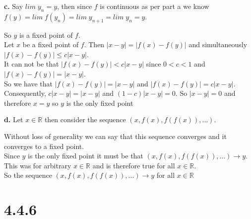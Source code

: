 \documentclass{article}
\begin{document}
{\Large\textbf{c.}} Say $lim\; y_n = y$, then since $f$ is continuous as per part a we know $f(y) = lim\; f(y_n) = lim\; y_{n+1} = lim\; y_n = y$.
\begin{center}
    \doublespacing
    So $y$ is a fixed point of $f$.
    \\Let $x$ be a fixed point of $f$. Then $|x - y| = |f(x) - f(y)|$ and simultaneously $|f(x) - f(y)|\leq c|x - y|$.
    \\It can not be that $|f(x) - f(y)| < c|x - y|$ since $0 < c < 1$ and $|f(x) - f(y)| = |x - y|$.
    \\So we have that $|f(x) - f(y)| = |x - y|$ and $|f(x) - f(y)| = c|x - y|$.
    \\Consequently, $c|x - y| = |x - y|$ and $(1 - c)|x - y| = 0$. So $|x - y| = 0$ and therefore $x = y$ so $y$ is the only fixed point \qedsymbol
\end{center}

{\Large\textbf{d.}} Let $x\in\mathbb{R}$ then consider the sequence $(x, f(x), f(f(x)), ...)$.
\begin{center}
    \doublespacing
    Without loss of generality we can say that this sequence converges and it converges to a fixed point.
    \\Since $y$ is the only fixed point it must be that $(x, f(x), f(f(x)), ...)\rightarrow y$.
    \\This was for arbitrary $x\in\mathbb{R}$ and is therefore true for all $x\in\mathbb{R}$.
    \\So the sequence $(x, f(x), f(f(x)), ...)\rightarrow y$ for all $x\in\mathbb{R}$ \qedsymbol
\end{center}


\newpage
\section*{4.4.6}
\end{document}
